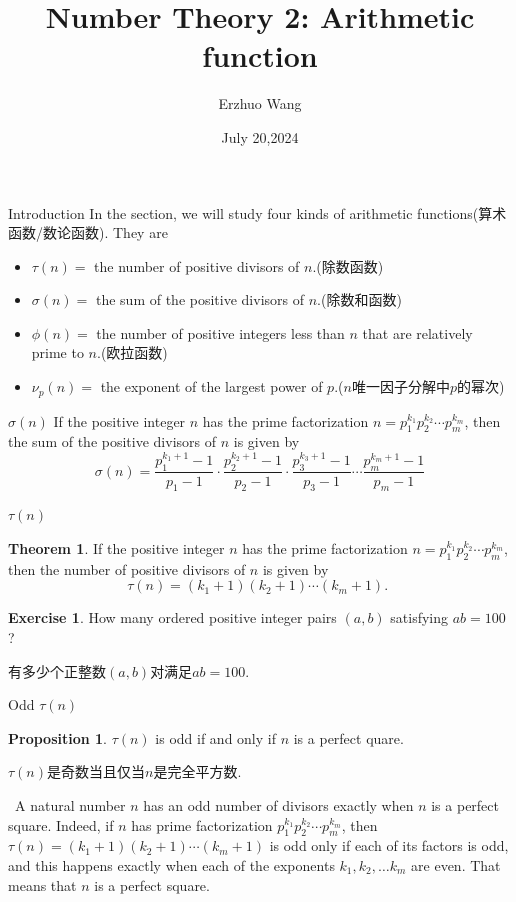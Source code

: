 \documentclass{beamer}
\title{Number Theory 2: Arithmetic function}
\institute{Youth STEM Academy}
\author{Erzhuo Wang}
\date{July 20,2024}
\theoremstyle{definition}
\newtheorem{theo}[defn]{Theorem}
\newtheorem{exer}[defn]{Exercise}
\newtheorem{prop}[defn]{Proposition}
\newenvironment{prooff}{{\noindent\it\textcolor{cyan!40!black}{Proof}:}\,}{\par}
\begin{document}
\begin{frame}
    \titlepage
\end{frame}
\begin{frame}{Introduction}
    In the section, we will study four kinds of arithmetic functions(算术函数/数论函数). 
    They are 
    \begin{itemize}
        \item $\tau(n)=$ the number of positive divisors of $n$.(除数函数)
        \item $\sigma(n)=$ the sum of the positive divisors of $n$.(除数和函数)
        \item $\phi(n)=$ the number of positive integers less than $n$ that are relatively prime to $n$.(欧拉函数)
        \item $\nu_p(n)=$ the exponent of the largest power of $p$.($n$唯一因子分解中$p$的幂次)
    \end{itemize}
\end{frame}
\begin{frame}{$\sigma(n)$}
    If the positive integer $n$ has the prime factorization $n=p_1^{k_1} p_2^{k_2} \cdots p_m^{k_m}$, then the sum of the positive divisors of $n$ is given by
    $$
    \sigma(n)=\frac{p_1^{k_1+1}-1}{p_1-1} \cdot \frac{p_2^{k_2+1}-1}{p_2-1} \cdot \frac{p_3^{k_3+1}-1}{p_3-1} \cdots \frac{p_m^{k_m+1}-1}{p_m-1}
    $$
\end{frame}
\begin{frame}{$\tau(n)$}
    \begin{theo}
        If the positive integer $n$ has the prime factorization $n=p_1^{k_1} p_2^{k_2} \cdots p_m^{k_m}$, then the number of positive divisors of $n$ is given by
        $$
        \tau(n)=\left(k_1+1\right)\left(k_2+1\right) \cdots\left(k_m+1\right) \text {. }
        $$
    \end{theo}
    \begin{exer} 
      How many ordered positive integer pairs $(a,b)$ satisfying $ab=100$?

      有多少个正整数$(a,b)$对满足$ab=100$.

    \end{exer}
\end{frame}
\begin{frame}{Odd $\tau(n)$}
    \begin{prop}
        $\tau(n)$ is odd if and only if $n$ is a perfect quare.

        $\tau(n)$是奇数当且仅当$n$是完全平方数.
    \end{prop}
    \pause 
    \begin{prooff}
        A natural number $n$ has an odd number of divisors exactly when $n$ is a perfect square. Indeed, if $n$ has prime factorization $p_1^{k_1} p_2^{k_2} \cdots p_m^{k_m}$, 
        then $\tau(n)=\left(k_1+1\right)\left(k_2+1\right) \cdots\left(k_m+1\right)$ is odd only if each of its factors is odd, and this happens exactly when each of the exponents $k_1, k_2, \ldots k_m$ are even. That means that $n$ is a perfect square.
    \end{prooff}
\end{frame}
\end{document}
